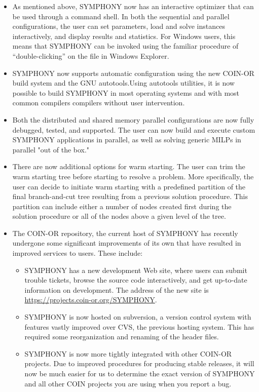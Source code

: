 \begin{itemize}

\item As mentioned above, SYMPHONY now has an interactive optimizer that can
be used through a command shell. In both the sequential and parallel
configurations, the user can set parameters, load and solve instances
interactively, and display results and statistics. For Windows users, this
means that SYMPHONY can be invoked using the familiar procedure of
``double-clicking'' on the  file in Windows Explorer.

\item SYMPHONY now supports automatic configuration using the new COIN-OR build
system and the GNU autotools.Using autotools utilities, it is now possible to
build SYMPHONY in most operating systems and with most common compilers
compilers without user intervention.

\item Both the distributed and shared memory parallel configurations are now
fully debugged, tested, and supported. The user can now build and execute
custom SYMPHONY applications in parallel, as well as solving generic MILPs in
parallel "out of the box."

\item There are now additional options for warm starting. The user can trim the
warm starting tree before starting to resolve a problem. More specifically,
the user can decide to initiate warm starting with a predefined partition of
the final branch-and-cut tree resulting from a previous solution procedure.
This partition can include either a number of nodes created first during the
solution procedure or all of the nodes above a given level of the tree.

\item The COIN-OR repository, the current host of SYMPHONY has
  recently undergone some significant improvements of its own that have
  resulted in improved services to users. These include: 

\begin{itemize}

\item SYMPHONY has a new development Web site, where users can submit trouble
  tickets, browse the source code interactively, and get up-to-date
  information on development. The address of the new site is
  \url{https://projects.coin-or.org/SYMPHONY}.

\item SYMPHONY is now hosted on subversion, a version control system with
  features vastly improved over CVS, the previous hosting system. This has
  required some reorganization and renaming of the header files.

\item SYMPHONY is now more tightly integrated with other COIN-OR projects. Due
  to improved procedures for producing stable releases, it will now be much
  easier for us to determine the exact version of SYMPHONY and all other COIN
  projects you are using when you report a bug.

\end{itemize}

\end{itemize}

